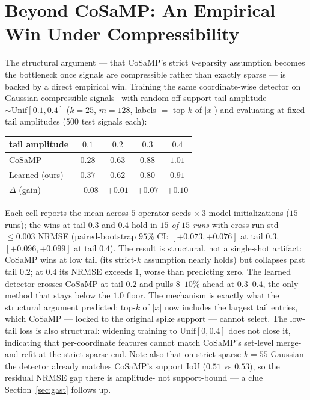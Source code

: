 \documentclass[conference,10pt]{IEEEtran}
\begin{document}
\section{Beyond CoSaMP: An Empirical Win Under Compressibility}
\label{sec:beyond}
The structural argument --- that CoSaMP's strict $k$-sparsity assumption
becomes the bottleneck once signals are compressible rather than
exactly sparse --- is backed by a direct empirical win.
Training the same coordinate-wise detector on Gaussian compressible
signals~\cite{cohen-devore} with random off-support tail amplitude
$\sim\!\mathrm{Unif}[0.1, 0.4]$ ($k{=}25$, $m{=}128$, labels $=$
top-$k$ of $|x|$) and evaluating at fixed tail amplitudes ($500$
test signals each):

\begin{center}\small
\setlength{\tabcolsep}{6pt}
\begin{tabular}{lcccc}
\toprule
tail amplitude   & $0.1$ & $0.2$ & $0.3$ & $0.4$ \\
\midrule
CoSaMP           & $\mathbf{0.28}$ & $0.63$ & $0.88$ & $1.01$ \\
Learned (ours)   & $0.37$ & $\mathbf{0.62}$ & $\mathbf{0.80}$ & $\mathbf{0.91}$ \\
$\Delta$ (gain)  & $-0.08$ & $+0.01$ & $\mathbf{+0.07}$ & $\mathbf{+0.10}$ \\
\bottomrule
\end{tabular}
\end{center}
\vspace{-2pt}
\vspace{2pt}

Each cell reports the mean across $5$ operator seeds $\times\,3$ model
initializations ($15$ runs); the wins at tail $0.3$ and $0.4$ hold in
\emph{$15$ of $15$ runs} with cross-run std $\le 0.003$ NRMSE
(paired-bootstrap $95\%$ CI: $[+0.073, +0.076]$ at tail $0.3$,
$[+0.096, +0.099]$ at tail $0.4$). The result is structural, not a
single-shot artifact: CoSaMP wins at low tail (its strict-$k$
assumption nearly holds) but collapses past tail $0.2$; at $0.4$ its
NRMSE exceeds $1$, worse than predicting zero. The learned detector
crosses CoSaMP at tail $0.2$ and pulls $8$--$10\%$ ahead at
$0.3$--$0.4$, the only method that stays below the $1.0$ floor. The
mechanism is exactly what the structural argument predicted: top-$k$ of
$|x|$ now includes the largest tail entries, which CoSaMP --- locked to
the original spike support --- cannot select. The low-tail loss is also structural: widening training to
$\mathrm{Unif}[0, 0.4]$ does not close it, indicating that
per-coordinate features cannot match CoSaMP's set-level
merge-and-refit at the strict-sparse end. Note also that on
strict-sparse $k{=}55$ Gaussian the detector already matches CoSaMP's
support IoU ($0.51$ vs $0.53$), so the residual NRMSE gap there is
amplitude- not support-bound --- a clue Section~\ref{sec:gast}
follows up.
\end{document}
